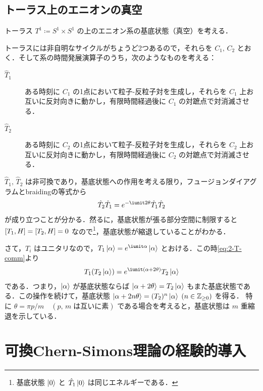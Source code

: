 \documentclass[TQFT_main]{subfiles}
\begin{document}
\subsection{トーラス上のエニオンの真空}

トーラス $T^1 \coloneqq S^1 \times S^1$ の上のエニオン系の基底状態（真空）を考える．

トーラスには非自明なサイクルがちょうど2つあるので，それらを $C_1,\, C_2$ とおく．そして系の時間発展演算子のうち，次のようなものを考える：
\begin{description}
    \item[\textbf{$\hat{T}_1$}] ある時刻に $C_1$ の1点において粒子-反粒子対を生成し，それらを $C_1$ 上お互いに反対向きに動かし，有限時間経過後に $C_1$ の対蹠点で対消滅させる．
    \item[\textbf{$\hat{T}_2$}] ある時刻に $C_2$ の1点において粒子-反粒子対を生成し，それらを $C_2$ 上お互いに反対向きに動かし，有限時間経過後に $C_2$ の対蹠点で対消滅させる．
\end{description}
$\hat{T}_1,\, \hat{T}_2$ は非可換であり，基底状態への作用を考える限り，フュージョンダイアグラムとbraidingの等式から
\begin{align}
    \label{eq:2-T-comm}
    \hat{T}_2 \hat{T}_1 = e^{-\iunit 2 \theta} \hat{T}_1 \hat{T}_2
\end{align}
が成り立つことが分かる．然るに，基底状態が張る部分空間に制限すると $\comm{T_1}{H} = \comm{T_2}{H} = 0$ なので\footnote{基底状態 $\ket{0}$ と $\hat{T}_1\ket{0}$ は同じエネルギーである．}，基底状態が縮退していることがわかる．

さて，$T_i$ はユニタリなので，$T_1 \ket{\alpha} = e^{\iunit \alpha} \ket{\alpha}$ とおける．この時\eqref{eq:2-T-comm}より
\begin{align}
    T_1 (T_2 \ket{\alpha}) = e^{\iunit (\alpha + 2\theta)} T_2 \ket{\alpha}
\end{align}
である．つまり，$\ket{\alpha}$ が基底状態ならば $\ket{\alpha + 2\theta} = T_2 \ket{\alpha}$ もまた基底状態である．この操作を続けて，基底状態 $\ket{\alpha + 2n \theta} = (T_2)^n \ket{\alpha}\; (n \in \mathbb{Z}_{\ge 0})$ を得る．
特に $\theta = \pi p / m\quad (p,\, m\; \text{は互いに素})$ である場合を考えると，基底状態は $m$ 重縮退を示している．




\section{可換Chern-Simons理論の経験的導入}
\end{document}
